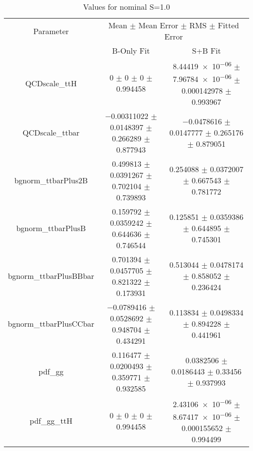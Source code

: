 \begin{table}
\centering
\caption{Values for nominal S=1.0}
\begin{tabular}{ccc}
\toprule
Parameter & \multicolumn{2}{c}{Mean $\pm$ Mean Error $\pm$ RMS $\pm$ Fitted Error}\\
 & B-Only Fit & S+B Fit\\
\midrule
QCDscale\_ttH & \num{0} $\pm$ \num{0} $\pm$ \num{0} $\pm$ \num{0.994458} & \num{8.44419e-06} $\pm$ \num{7.96784e-06} $\pm$ \num{0.000142978} $\pm$ \num{0.993967}\\
QCDscale\_ttbar & \num{-0.00311022} $\pm$ \num{0.0148397} $\pm$ \num{0.266289} $\pm$ \num{0.877943} & \num{-0.0478616} $\pm$ \num{0.0147777} $\pm$ \num{0.265176} $\pm$ \num{0.879051}\\
bgnorm\_ttbarPlus2B & \num{0.499813} $\pm$ \num{0.0391267} $\pm$ \num{0.702104} $\pm$ \num{0.739893} & \num{0.254088} $\pm$ \num{0.0372007} $\pm$ \num{0.667543} $\pm$ \num{0.781772}\\
bgnorm\_ttbarPlusB & \num{0.159792} $\pm$ \num{0.0359242} $\pm$ \num{0.644636} $\pm$ \num{0.746544} & \num{0.125851} $\pm$ \num{0.0359386} $\pm$ \num{0.644895} $\pm$ \num{0.745301}\\
bgnorm\_ttbarPlusBBbar & \num{0.701394} $\pm$ \num{0.0457705} $\pm$ \num{0.821322} $\pm$ \num{0.173931} & \num{0.513044} $\pm$ \num{0.0478174} $\pm$ \num{0.858052} $\pm$ \num{0.236424}\\
bgnorm\_ttbarPlusCCbar & \num{-0.0789416} $\pm$ \num{0.0528692} $\pm$ \num{0.948704} $\pm$ \num{0.434291} & \num{0.113834} $\pm$ \num{0.0498334} $\pm$ \num{0.894228} $\pm$ \num{0.441961}\\
pdf\_gg & \num{0.116477} $\pm$ \num{0.0200493} $\pm$ \num{0.359771} $\pm$ \num{0.932585} & \num{0.0382506} $\pm$ \num{0.0186443} $\pm$ \num{0.33456} $\pm$ \num{0.937993}\\
pdf\_gg\_ttH & \num{0} $\pm$ \num{0} $\pm$ \num{0} $\pm$ \num{0.994458} & \num{2.43106e-06} $\pm$ \num{8.67417e-06} $\pm$ \num{0.000155652} $\pm$ \num{0.994499}\\
\bottomrule
\end{tabular}
\end{table}